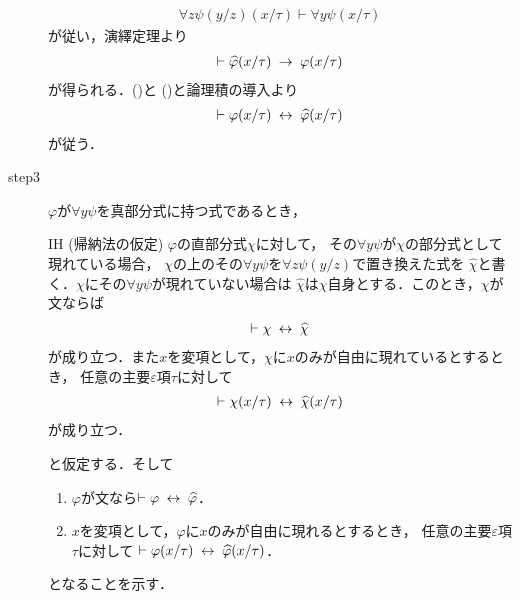 \begin{sketch}
\begin{description}
				\begin{align}
					\forall z \psi(y/z)(x/\tau) \vdash \forall y \psi(x/\tau)
				\end{align}
				が従い，演繹定理より
				\begin{align}
					\vdash \widehat{\varphi}(x/\tau) \hspace{0.25em}\rightarrow\hspace{0.25em} \varphi(x/\tau)
					\label{fom:equivalence_by_replacing_bound_variables_4}
				\end{align}
				が得られる．()と
				()と論理積の導入より
				\begin{align}
					\vdash \varphi(x/\tau) \hspace{0.25em}\leftrightarrow\hspace{0.25em} \widehat{\varphi}(x/\tau)
				\end{align}
				が従う．
				
			\item[step3]
				$\varphi$が$\forall y \psi$を真部分式に持つ式であるとき，
				\begin{itembox}[l]{IH (帰納法の仮定)}
					$\varphi$の直部分式$\chi$に対して，
					その$\forall y \psi$が$\chi$の部分式として現れている場合，
					$\chi$の上のその$\forall y \psi$を$\forall z \psi(y/z)$で置き換えた式を
					$\widehat{\chi}$と書く．$\chi$にその$\forall y \psi$が現れていない場合は
					$\widehat{\chi}$は$\chi$自身とする．このとき，$\chi$が文ならば
					\begin{align}
						\vdash \chi \hspace{0.25em}\leftrightarrow\hspace{0.25em} \widehat{\chi}
					\end{align}
					が成り立つ\footnotemark．また$x$を変項として，$\chi$に$x$のみが自由に現れているとするとき，
					任意の主要$\varepsilon$項$\tau$に対して
					\begin{align}
						\vdash \chi(x/\tau) \hspace{0.25em}\leftrightarrow\hspace{0.25em} \widehat{\chi}(x/\tau)
					\end{align}
					が成り立つ．
				\end{itembox}
				と仮定する．そして
				\begin{enumerate}
					\item $\varphi$が文なら$\vdash \varphi \hspace{0.25em}\leftrightarrow\hspace{0.25em} \widehat{\varphi}$．
					\item $x$を変項として，$\varphi$に$x$のみが自由に現れるとするとき，
						任意の主要$\varepsilon$項$\tau$に対して
						$\vdash \varphi(x/\tau) \hspace{0.25em}\leftrightarrow\hspace{0.25em} \widehat{\varphi}(x/\tau)$．
				\end{enumerate}
				となることを示す．
			
				

\end{description}
\end{sketch}
